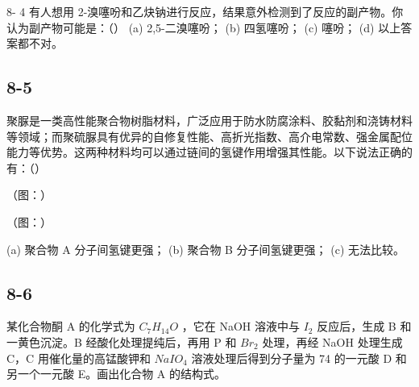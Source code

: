 8- 4 有人想用 2-溴噻吩和乙炔钠进行反应，结果意外检测到了反应的副产物。你认为副产物可能是：（）
(a) 2,5-二溴噻吩； (b) 四氢噻吩； (c) 噻吩； (d) 以上答案都不对。

\subsection*{8-5}
聚脲是一类高性能聚合物树脂材料，广泛应用于防水防腐涂料、胶黏剂和浇铸材料等领域；而聚硫脲具有优异的自修复性能、高折光指数、高介电常数、强金属配位能力等优势。这两种材料均可以通过链间的氢键作用增强其性能。以下说法正确的有：（）

（图：）

（图：）

(a) 聚合物 A 分子间氢键更强； (b) 聚合物 B 分子间氢键更强； (c) 无法比较。

\subsection*{8-6}
某化合物酮 A 的化学式为 $C_{7}H_{14}O$ ，它在 NaOH 溶液中与 $I_{2}$ 反应后，生成 B 和一黄色沉淀。B 经酸化处理提纯后，再用 P 和 $Br_{2}$ 处理，再经 NaOH 处理生成 C，C 用催化量的高锰酸钾和 $NaIO_{4}$ 溶液处理后得到分子量为 74 的一元酸 D 和另一个一元酸 E。画出化合物 A 的结构式。
